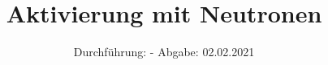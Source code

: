 

\subject{V702}
\title{Aktivierung mit Neutronen}
\date{%
  Durchführung: -
  \hspace{3em}
  Abgabe: 02.02.2021
}



\maketitle
\thispagestyle{empty}
\tableofcontents
\newpage







\printbibliography{}


